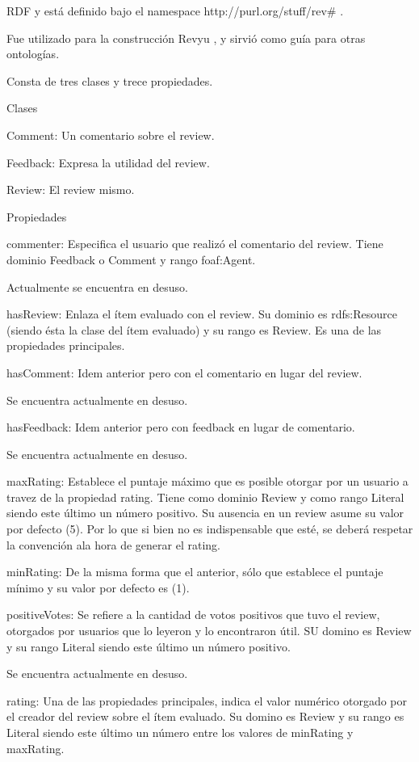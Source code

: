 RDF y está definido bajo el namespace http://purl.org/stuff/rev\# .

Fue utilizado para la construcción Revyu , y sirvió como guía para otras ontologías.

Consta de tres clases y trece propiedades.

Clases

Comment: Un comentario sobre el review. 

Feedback: Expresa la utilidad del review. 


Review: El review mismo. 


Propiedades


commenter: Especifica el usuario que realizó el comentario del review. Tiene dominio Feedback o Comment y rango foaf:Agent.


Actualmente se encuentra en desuso.


hasReview: Enlaza el ítem evaluado con el review. Su dominio es rdfs:Resource (siendo ésta la clase del ítem evaluado) y su rango es Review. Es una de 
las propiedades principales. 


hasComment: Idem anterior pero con el comentario en lugar del review.

Se encuentra actualmente en desuso.

hasFeedback: Idem anterior pero con feedback en lugar de comentario.

Se encuentra actualmente en desuso.


maxRating: Establece el puntaje máximo que es posible otorgar por un usuario a travez de la propiedad rating. Tiene como dominio 
Review y como rango Literal siendo este último un número positivo. Su ausencia en un review asume su valor por defecto (5). Por lo que 
si bien no es indispensable que esté, se deberá respetar la convención ala hora de generar el rating.



minRating: De la misma forma que el anterior, sólo que establece el puntaje mínimo y su valor por defecto es (1).


positiveVotes: Se refiere a la cantidad de votos positivos que tuvo el review, otorgados por usuarios que lo leyeron y lo encontraron 
útil. SU domino es Review y su rango Literal siendo este último un número positivo.


Se encuentra actualmente en desuso.


rating: Una de las propiedades principales, indica el valor numérico otorgado por el creador del review sobre el ítem evaluado. 
Su domino es Review y su rango es Literal siendo este último un número entre los valores de minRating y maxRating.



